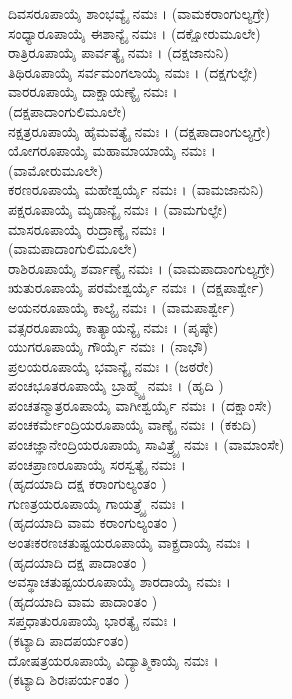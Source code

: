  ದಿವಸರೂಪಾಯೈ ಶಾಂಭವ್ಯೈ ನಮಃ । (ವಾಮಕರಾಂಗುಲ್ಯಗ್ರೇ)\\
 ಸಂಧ್ಯಾರೂಪಾಯೈ ಈಶಾನ್ಯೈ ನಮಃ । (ದಕ್ಷೋರುಮೂಲೇ)\\
 ರಾತ್ರಿರೂಪಾಯೈ ಪಾರ್ವತ್ಯೈ ನಮಃ । (ದಕ್ಷಜಾನುನಿ)\\
 ತಿಥಿರೂಪಾಯೈ ಸರ್ವಮಂಗಲಾಯೈ ನಮಃ । (ದಕ್ಷಗುಲ್ಫೇ)\\
 ವಾರರೂಪಾಯೈ ದಾಕ್ಷಾಯಣ್ಯೈ ನಮಃ । \\(ದಕ್ಷಪಾದಾಂಗುಲಿಮೂಲೇ)\\
 ನಕ್ಷತ್ರರೂಪಾಯೈ ಹೈಮವತ್ಯೈ ನಮಃ । (ದಕ್ಷಪಾದಾಂಗುಲ್ಯಗ್ರೇ)\\
 ಯೋಗರೂಪಾಯೈ ಮಹಾಮಾಯಾಯೈ ನಮಃ । \\(ವಾಮೋರುಮೂಲೇ)\\
 ಕರಣರೂಪಾಯೈ ಮಹೇಶ್ವರ್ಯೈ ನಮಃ । (ವಾಮಜಾನುನಿ)\\
 ಪಕ್ಷರೂಪಾಯೈ ಮೃಡಾನ್ಯೈ ನಮಃ । (ವಾಮಗುಲ್ಫೇ)\\
 ಮಾಸರೂಪಾಯೈ ರುದ್ರಾಣ್ಯೈ ನಮಃ । \\(ವಾಮಪಾದಾಂಗುಲಿಮೂಲೇ)\\
 ರಾಶಿರೂಪಾಯೈ ಶರ್ವಾಣ್ಯೈ ನಮಃ । (ವಾಮಪಾದಾಂಗುಲ್ಯಗ್ರೇ)\\
 ಋತುರೂಪಾಯೈ ಪರಮೇಶ್ವರ್ಯೈ ನಮಃ । (ದಕ್ಷಪಾರ್ಶ್ವೇ)\\
 ಅಯನರೂಪಾಯೈ ಕಾಲ್ಯೈ ನಮಃ । (ವಾಮಪಾರ್ಶ್ವೇ)\\
 ವತ್ಸರರೂಪಾಯೈ ಕಾತ್ಯಾಯನ್ಯೈ ನಮಃ । (ಪೃಷ್ಠೇ)\\
 ಯುಗರೂಪಾಯೈ ಗೌರ್ಯೈ ನಮಃ । (ನಾಭೌ)\\
 ಪ್ರಲಯರೂಪಾಯೈ ಭವಾನ್ಯೈ ನಮಃ । (ಜಠರೇ)\\
 ಪಂಚಭೂತರೂಪಾಯೈ ಬ್ರಾಹ್ಮ್ಯೈ ನಮಃ । (ಹೃದಿ )\\
 ಪಂಚತನ್ಮಾತ್ರರೂಪಾಯೈ ವಾಗೀಶ್ವರ್ಯೈ ನಮಃ । (ದಕ್ಷಾಂಸೇ)\\
 ಪಂಚಕರ್ಮೇಂದ್ರಿಯರೂಪಾಯೈ ವಾಣ್ಯೈ ನಮಃ । (ಕಕುದಿ)\\
 ಪಂಚಜ್ಞಾನೇಂದ್ರಿಯರೂಪಾಯೈ ಸಾವಿತ್ರ್ಯೈ ನಮಃ । (ವಾಮಾಂಸೇ)\\
 ಪಂಚಪ್ರಾಣರೂಪಾಯೈ ಸರಸ್ವತ್ಯೈ ನಮಃ । \\(ಹೃದಯಾದಿ ದಕ್ಷ ಕರಾಂಗುಲ್ಯಂತಂ )\\
 ಗುಣತ್ರಯರೂಪಾಯೈ ಗಾಯತ್ರ್ಯೈ ನಮಃ । \\(ಹೃದಯಾದಿ ವಾಮ ಕರಾಂಗುಲ್ಯಂತಂ )\\
 ಅಂತಃಕರಣಚತುಷ್ಟಯರೂಪಾಯೈ ವಾಕ್ಪ್ರದಾಯೈ ನಮಃ । \\(ಹೃದಯಾದಿ ದಕ್ಷ ಪಾದಾಂತಂ )\\
 ಅವಸ್ಥಾಚತುಷ್ಟಯರೂಪಾಯೈ ಶಾರದಾಯೈ ನಮಃ । \\(ಹೃದಯಾದಿ ವಾಮ ಪಾದಾಂತಂ )\\
 ಸಪ್ತಧಾತುರೂಪಾಯೈ ಭಾರತ್ಯೈ ನಮಃ । \\(ಕಟ್ಯಾದಿ ಪಾದಪರ್ಯಂತಂ)\\
 ದೋಷತ್ರಯರೂಪಾಯೈ ವಿದ್ಯಾತ್ಮಿಕಾಯೈ ನಮಃ ।\\(ಕಟ್ಯಾದಿ ಶಿರಃಪರ್ಯಂತಂ )
 
